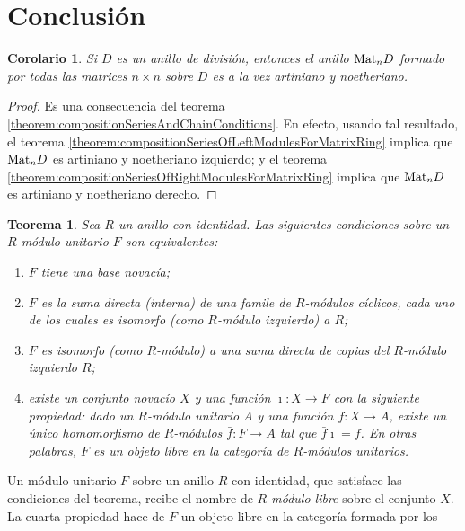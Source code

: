 \documentclass{report}
\newcommand{\Mat}{\textnormal{Mat}}
\newtheorem{theorem}{Teorema}
\newtheorem{corollary}{Corolario}
\begin{document}
  \section{Conclusión}

  \begin{corollary}
    \label{corollary:matrixRingIsArtinianAndNoetherian}
    Si \(D\) es un anillo de división, entonces el anillo \(\Mat_n D\) formado por todas las matrices \(n \times n\) sobre \(D\) es a la vez artiniano y noetheriano.
  \end{corollary}
  \begin{proof}
    Es una consecuencia del teorema \ref{theorem:compositionSeriesAndChainConditions}.
    En efecto, usando tal resultado, el teorema \ref{theorem:compositionSeriesOfLeftModulesForMatrixRing} implica que \(\Mat_n D\) es artiniano y noetheriano izquierdo; y el teorema \ref{theorem:compositionSeriesOfRightModulesForMatrixRing} implica que \(\Mat_n D\) es artiniano y noetheriano derecho.
  \end{proof}

  \newpage

  \begin{theorem}
    \label{theorem:freeUnitalModulesOverARingWithIdentity}
    Sea \(R\) un anillo con identidad.
    Las siguientes condiciones sobre un \(R\)-módulo unitario \(F\) son equivalentes:
    \begin{enumerate}
      \item \(F\) tiene una base novacía;
      \item \(F\) es la suma directa (interna) de una famile de \(R\)-módulos cíclicos, cada uno de los cuales es isomorfo (como \(R\)-módulo izquierdo) a \(R\);
      \item \(F\) es isomorfo (como \(R\)-módulo) a una suma directa de copias del \(R\)-módulo izquierdo \(R\);
      \item existe un conjunto novacío \(X\) y una función \(\imath : X \rightarrow F\) con la siguiente propiedad:
      dado un \(R\)-módulo unitario \(A\) y una función \(f : X \rightarrow A\), existe un único homomorfismo de \(R\)-módulos \(\bar{f} : F \rightarrow A\) tal que \(\bar{f} \imath = f\).
      En otras palabras, \(F\) es un objeto libre en la categoría de \(R\)-módulos unitarios.
    \end{enumerate}
  \end{theorem}

  Un módulo unitario \(F\) sobre un anillo \(R\) con identidad, que satisface las condiciones del teorema, recibe el nombre de \emph{\(R\)-módulo libre} sobre el conjunto \(X\).
  La cuarta propiedad hace de \(F\) un objeto libre en la categoría formada por los 
\end{document}
